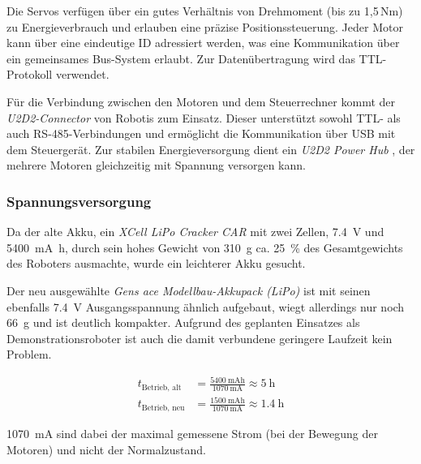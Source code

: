 Die Servos verfügen über ein gutes Verhältnis von Drehmoment (bis zu 1{,}5\,Nm) zu Energieverbrauch und erlauben eine präzise Positionssteuerung. Jeder Motor kann über eine eindeutige ID adressiert werden, was eine Kommunikation über ein gemeinsames Bus-System erlaubt. Zur Datenübertragung wird das TTL-Protokoll verwendet.

Für die Verbindung zwischen den Motoren und dem Steuerrechner kommt der \textit{U2D2-Connector} von Robotis \cite{robotis_u2d2} zum Einsatz. Dieser unterstützt sowohl TTL- als auch RS-485-Verbindungen und ermöglicht die Kommunikation über USB mit dem Steuergerät. Zur stabilen Energieversorgung dient ein \textit{U2D2 Power Hub} \cite{robotis_u2d2_power_hub}, der mehrere Motoren gleichzeitig mit Spannung versorgen kann.


\subsubsection{Spannungsversorgung}

Da der alte Akku, ein \textit{XCell LiPo Cracker CAR} \cite{xcell_akku} mit zwei Zellen, \qty{7.4}{\volt} und \qty{5400}{\milli\ampere\hour}, durch sein hohes Gewicht von \qty{310}{\gram} ca. \qty{25}{\percent} des Gesamtgewichts des Roboters ausmachte, wurde ein leichterer Akku gesucht.

Der neu ausgewählte \textit{Gens ace Modellbau-Akkupack (LiPo)} \cite{gens_ace_akku} ist mit seinen ebenfalls \qty{7.4}{\volt} Ausgangsspannung ähnlich aufgebaut, wiegt allerdings nur noch \qty{66}{\gram} und ist deutlich kompakter. Aufgrund des geplanten Einsatzes als Demonstrationsroboter ist auch die damit verbundene geringere Laufzeit kein Problem.

\begin{align*}
t_{\text{Betrieb, alt}} &= \frac{\qty{5400}{\milli\ampere\hour}}{\qty{1070}{\milli\ampere}} \approx \qty{5}{\hour} \\
t_{\text{Betrieb, neu}} &= \frac{\qty{1500}{\milli\ampere\hour}}{\qty{1070}{\milli\ampere}} \approx \qty{1.4}{\hour}
\end{align*}

\qty{1070}{\milli\ampere} sind dabei der maximal gemessene Strom (bei der Bewegung der Motoren) und nicht der Normalzustand.


